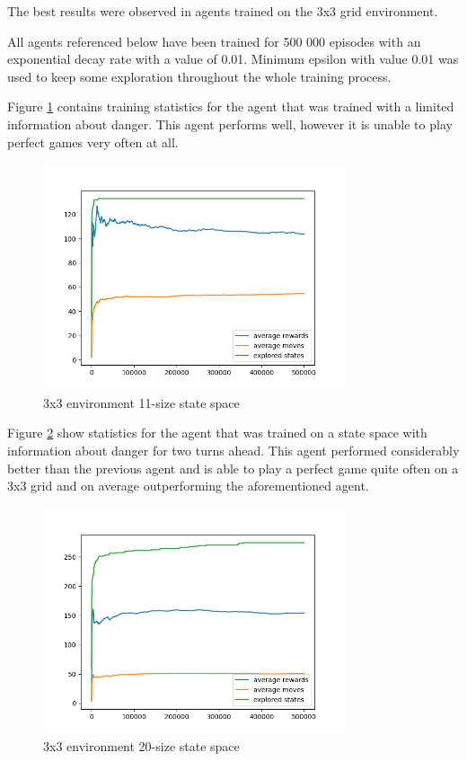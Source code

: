 \documentclass[lettersize,journal]{IEEEtran}
\begin{document}
The best results were observed in agents trained on the 3x3 grid environment.

All agents referenced below have been trained for 500 000 episodes
with an exponential decay rate with a value of 0.01. Minimum epsilon with value 0.01
was used to keep some exploration throughout the whole training
process.

Figure \ref{fig1} contains training statistics for the agent that was trained
with a limited information about danger. This agent performs well, however
it is unable to play perfect games very often at all.


\begin{figure}[!t]
\centering
\includegraphics[width=3.5in]{3_fig.png}
\caption{3x3 environment 11-size state space}
\label{fig1}
\end{figure}

Figure \ref{fig2} show statistics for the agent that was trained on a
state space with information about danger for two turns ahead.
This agent performed considerably better than the previous agent and
is able to play a perfect game quite often on a 3x3 grid and on average outperforming
the aforementioned agent.

\begin{figure}[!t]
\centering
\includegraphics[width=3.5in]{3-depth_fig.png}
\caption{3x3 environment 20-size state space}
\label{fig2}
\end{figure}
\end{document}
